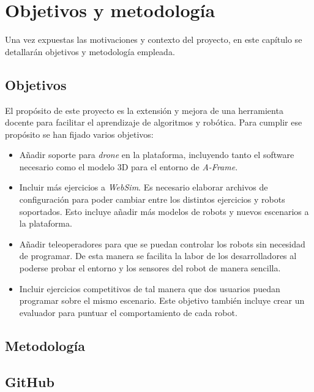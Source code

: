 \chapter{Objetivos y metodología}
Una vez expuestas las motivaciones y contexto del proyecto, en este capítulo se detallarán objetivos y metodología empleada. 

\label{chap:objetivos}
\section{Objetivos}
El propósito de este proyecto es la extensión y mejora de una herramienta docente para facilitar el aprendizaje de algoritmos y robótica. Para cumplir ese propósito se han fijado varios objetivos:
\begin{itemize}
    \item Añadir soporte para \textit{drone} en la plataforma, incluyendo tanto el software necesario como el modelo 3D para el entorno de \textit{A-Frame}.
    
    \item Incluir más ejercicios a \textit{WebSim}. Es necesario elaborar archivos de configuración para poder cambiar entre los distintos ejercicios y robots soportados. Esto incluye añadir más modelos de robots y nuevos escenarios a la plataforma.
    
    \item Añadir teleoperadores para que se puedan controlar los robots sin necesidad de programar. De esta manera se facilita la labor de los desarrolladores al poderse probar el entorno y los sensores del robot de manera sencilla.
    
    \item Incluir ejercicios competitivos de tal manera que dos usuarios puedan programar sobre el mismo escenario. Este objetivo también incluye crear un evaluador para puntuar el comportamiento de cada robot. 
    
\end{itemize}
\section{Metodología}
\label{sec:metodologia}



\section{GitHub}
\label{sec:github}
